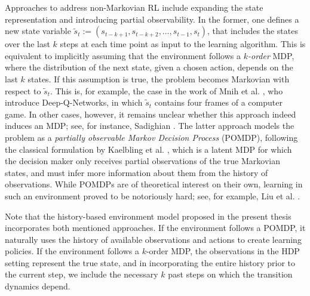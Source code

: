 \documentclass[
    a4paper,
    11pt,
    bibliography=totoc,
    listof=totoc,      
    headinclude=true,
    cleardoublepage=empty,
]{scrbook}
\theoremstyle{plain}
\theoremstyle{definition}
\theoremstyle{remark}
\begin{document}
Approaches to address non-Markovian RL include expanding the state 
representation and introducing partial observability. In the former, one 
defines a new state variable $\tilde{s}_t := (s_{t-k+1},
s_{t-k+2}, \dots, s_{t-1}, 
s_t)$, that includes the states over the last $k$ steps at each time
point as input to the learning algorithm. This is equivalent to implicitly 
assuming that the environment follows a \textit{$k$-order} MDP, where the 
distribution of the next state, given a chosen action, depends on the last $k$ 
states. If this assumption is true, the problem becomes Markovian with respect 
to $\tilde{s}_t$. This is, for example, the case in the work of Mnih et al. 
\cite{mnih2015_hctdrl}, who introduce Deep-Q-Networks, in which $\tilde{s}_t$ 
contains four frames of a computer game. In other cases, however, it remains 
unclear whether this approach indeed induces an MDP; see, for instance, Sadighian 
\cite{sadighian2019_drlcmm,sadighian2020_edrlfcmm}. The latter approach models 
the problem as a \textit{partially observable Markov Decision Process} (POMDP), 
following the classical formulation by Kaelbling et al. \cite{kaelbling1998_paposd}, 
which is a latent MDP for which the decision maker only receives partial 
observations of the true Markovian states, and must infer more information 
about them from the history of observations. While POMDPs are of theoretical 
interest on their own, learning in such an environment proved to be notoriously 
hard; see, for example, Liu et al. \cite{liu2022_wporls}. 

Note that the history-based environment model proposed in the present thesis 
incorporates both mentioned approaches. If the environment follows a POMDP, 
it naturally uses the history of available observations and actions to create
learning policies. If the environment follows a $k$-order MDP, the
observations in the HDP setting represent the true state, and in incorporating
the entire history prior to the current step, we include the necessary $k$
past steps on which the transition dynamics depend.
\end{document}
